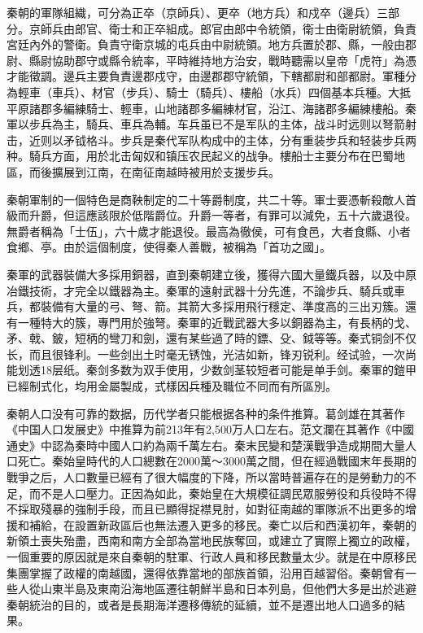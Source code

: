 秦朝的軍隊組織，可分為正卒（京師兵）、更卒（地方兵）和戍卒（邊兵）三部分。京師兵由郎官、衛士和正卒組成。郎官由郎中令統領，衛士由衛尉統領，負責宮廷內外的警衛。負責守衛京城的屯兵由中尉統領。地方兵置於郡、縣，一般由郡尉、縣尉協助郡守或縣令統率，平時維持地方治安，戰時聽需以皇帝「虎符」為憑才能徵調。邊兵主要負責邊郡戍守，由邊郡郡守統領，下轄都尉和部都尉。軍種分為輕車（車兵）、材官（步兵）、騎士（騎兵）、樓船（水兵）四個基本兵種。大抵平原諸郡多編練騎士、輕車，山地諸郡多編練材官，沿江、海諸郡多編練樓船。秦軍以步兵為主，騎兵、車兵為輔。车兵虽已不是军队的主体，战斗时远则以弩箭射击，近则以矛钺格斗。步兵是秦代军队构成中的主体，分有重装步兵和轻装步兵两种。騎兵方面，用於北击匈奴和镇压农民起义的战争。樓船士主要分布在巴蜀地區，而後擴展到江南，在南征南越時被用於支援步兵。

秦朝軍制的一個特色是商鞅制定的二十等爵制度，共二十等。軍士要憑斬殺敵人首級而升爵，但這應該限於低階爵位。升爵一等者，有罪可以減免，五十六歲退役。無爵者稱為「士伍」，六十歲才能退役。最高為徹侯，可有食邑，大者食縣、小者食鄉、亭。由於這個制度，使得秦人善戰，被稱為「首功之國」。

秦軍的武器裝備大多採用銅器，直到秦朝建立後，獲得六國大量鐵兵器，以及中原冶鐵技術，才完全以鐵器為主。秦軍的遠射武器十分先進，不論步兵、騎兵或車兵，都裝備有大量的弓、弩、箭。其箭大多採用飛行穩定、準度高的三出刃簇。還有一種特大的簇，專門用於強弩。秦軍的近戰武器大多以銅器為主，有長柄的戈、矛、戟、鈹，短柄的彎刀和劍，還有某些過了時的鏢、殳、鉞等等。秦式铜剑不仅长，而且很锋利。一些剑出土时毫无锈蚀，光洁如新，锋刃锐利。经试验，一次尚能划透18层纸。秦剑多数为双手使用，少数剑茎较短者可能是单手剑。秦軍的鎧甲已經制式化，均用金屬製成，式樣因兵種及職位不同而有所區別。

秦朝人口没有可靠的数据，历代学者只能根据各种的条件推算。葛剑雄在其著作《中国人口发展史》中推算为前213年有2,500万人口左右。范文瀾在其著作《中國通史》中認為秦時中國人口約為兩千萬左右。秦末民變和楚漢戰爭造成期間大量人口死亡。秦始皇時代的人口總數在2000萬～3000萬之間，但在經過戰國末年長期的戰爭之后，人口數量已經有了很大幅度的下降，所以當時普遍存在的是勞動力的不足，而不是人口壓力。正因為如此，秦始皇在大規模征調民眾服勞役和兵役時不得不採取殘暴的強制手段，而且已顯得捉襟見肘，如對征南越的軍隊派不出更多的增援和補給，在設置新政區后也無法遷入更多的移民。秦亡以后和西漢初年，秦朝的新領土喪失殆盡，西南和南方全部為當地民族奪回，或建立了實際上獨立的政權，一個重要的原因就是來自秦朝的駐軍、行政人員和移民數量太少。就是在中原移民集團掌握了政權的南越國，還得依靠當地的部族首領，沿用百越習俗。秦朝曾有一些人從山東半島及東南沿海地區遷往朝鮮半島和日本列島，但他們大多是出於逃避秦朝統治的目的，或者是長期海洋遷移傳統的延續，並不是遷出地人口過多的結果。

